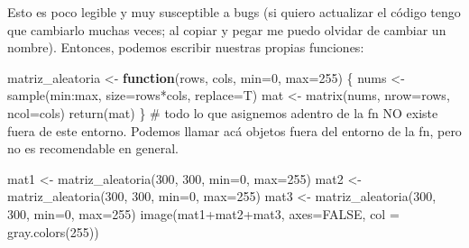 \documentclass[
  letterpaper,
  DIV=11,
  numbers=noendperiod]{scrartcl}
\newenvironment{Shaded}{\begin{snugshade}}{\end{snugshade}}
\newcommand{\AttributeTok}[1]{\textcolor[rgb]{0.40,0.45,0.13}{#1}}
\newcommand{\CommentTok}[1]{\textcolor[rgb]{0.37,0.37,0.37}{#1}}
\newcommand{\ConstantTok}[1]{\textcolor[rgb]{0.56,0.35,0.01}{#1}}
\newcommand{\ControlFlowTok}[1]{\textcolor[rgb]{0.00,0.23,0.31}{\textbf{#1}}}
\newcommand{\DecValTok}[1]{\textcolor[rgb]{0.68,0.00,0.00}{#1}}
\newcommand{\FunctionTok}[1]{\textcolor[rgb]{0.28,0.35,0.67}{#1}}
\newcommand{\NormalTok}[1]{\textcolor[rgb]{0.00,0.23,0.31}{#1}}
\newcommand{\OtherTok}[1]{\textcolor[rgb]{0.00,0.23,0.31}{#1}}
\newcommand{\SpecialCharTok}[1]{\textcolor[rgb]{0.37,0.37,0.37}{#1}}
\begin{document}
Esto es poco legible y muy susceptible a bugs (si quiero actualizar el
código tengo que cambiarlo muchas veces; al copiar y pegar me puedo
olvidar de cambiar un nombre). Entonces, podemos escribir nuestras
propias funciones:

\begin{Shaded}
\begin{Highlighting}[]
\NormalTok{matriz\_aleatoria }\OtherTok{\textless{}{-}} \ControlFlowTok{function}\NormalTok{(rows, cols, }\AttributeTok{min=}\DecValTok{0}\NormalTok{, }\AttributeTok{max=}\DecValTok{255}\NormalTok{) \{}
\NormalTok{  nums }\OtherTok{\textless{}{-}} \FunctionTok{sample}\NormalTok{(min}\SpecialCharTok{:}\NormalTok{max, }\AttributeTok{size=}\NormalTok{rows}\SpecialCharTok{*}\NormalTok{cols, }\AttributeTok{replace=}\NormalTok{T)   }
\NormalTok{  mat }\OtherTok{\textless{}{-}} \FunctionTok{matrix}\NormalTok{(nums, }\AttributeTok{nrow=}\NormalTok{rows, }\AttributeTok{ncol=}\NormalTok{cols)   }
  \FunctionTok{return}\NormalTok{(mat) }
\NormalTok{\} }
\CommentTok{\# todo lo que asignemos adentro de la fn NO existe fuera de este entorno. Podemos llamar acá objetos fuera del entorno de la fn, pero no es recomendable en general.}
\end{Highlighting}
\end{Shaded}

\begin{Shaded}
\begin{Highlighting}[]
\NormalTok{mat1 }\OtherTok{\textless{}{-}} \FunctionTok{matriz\_aleatoria}\NormalTok{(}\DecValTok{300}\NormalTok{, }\DecValTok{300}\NormalTok{, }\AttributeTok{min=}\DecValTok{0}\NormalTok{, }\AttributeTok{max=}\DecValTok{255}\NormalTok{) }
\NormalTok{mat2 }\OtherTok{\textless{}{-}} \FunctionTok{matriz\_aleatoria}\NormalTok{(}\DecValTok{300}\NormalTok{, }\DecValTok{300}\NormalTok{, }\AttributeTok{min=}\DecValTok{0}\NormalTok{, }\AttributeTok{max=}\DecValTok{255}\NormalTok{) }
\NormalTok{mat3 }\OtherTok{\textless{}{-}} \FunctionTok{matriz\_aleatoria}\NormalTok{(}\DecValTok{300}\NormalTok{, }\DecValTok{300}\NormalTok{, }\AttributeTok{min=}\DecValTok{0}\NormalTok{, }\AttributeTok{max=}\DecValTok{255}\NormalTok{)}
\FunctionTok{image}\NormalTok{(mat1}\SpecialCharTok{+}\NormalTok{mat2}\SpecialCharTok{+}\NormalTok{mat3, }\AttributeTok{axes=}\ConstantTok{FALSE}\NormalTok{, }\AttributeTok{col =} \FunctionTok{gray.colors}\NormalTok{(}\DecValTok{255}\NormalTok{))}
\end{Highlighting}
\end{Shaded}
\end{document}
